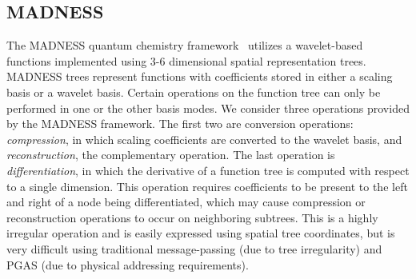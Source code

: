 
%
%
%
%


\subsection{MADNESS}

The MADNESS quantum chemistry framework~\cite{thornton09} utilizes a
wavelet-based functions implemented using 3-6 dimensional spatial
representation trees. MADNESS trees represent functions with 
coefficients stored in either a scaling basis or a wavelet basis.
Certain operations on the function tree can only be performed in
one or the other basis modes. We consider three operations
provided by the MADNESS framework. The first two are conversion
operations: {\em compression}, in which scaling coefficients
are converted to the wavelet basis, and {\em reconstruction}, 
the complementary operation. The last operation is {\em differentiation},
in which the derivative of a function tree is computed with respect
to a single dimension. This operation requires coefficients 
to be present to the left and right of a node being differentiated,
which may cause compression or reconstruction operations to 
occur on neighboring subtrees. This is a highly irregular operation
and is easily expressed using spatial tree coordinates, but is
very difficult using traditional message-passing (due to tree
irregularity) and PGAS (due to physical addressing requirements).

